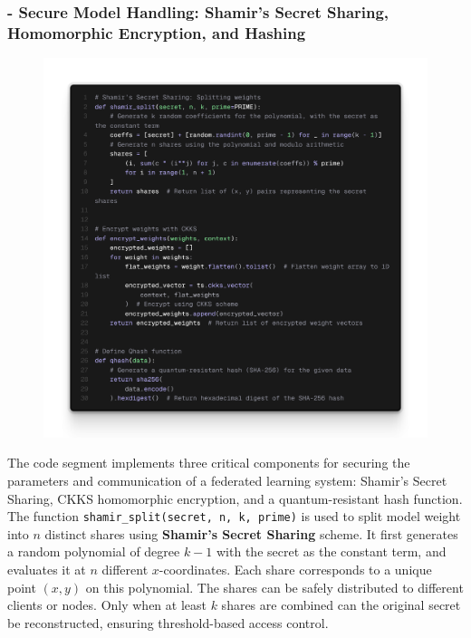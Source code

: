 \documentclass[10pt]{article}
\begin{document}
\subsubsection*{- Secure Model Handling: Shamir's Secret Sharing, Homomorphic Encryption, and Hashing}
\begin{figure}[h!]
	\centering
	\includegraphics[height = 0.47\textheight]{img/QFL_code/1.png}
\end{figure}
\noindent The code segment implements three critical components for securing the parameters and communication of a federated learning system: Shamir’s Secret Sharing, CKKS homomorphic encryption, and a quantum-resistant hash function.\\
The function \texttt{shamir\_split(secret, n, k, prime)} is used to split model weight into $n$ distinct shares using \textbf{Shamir’s Secret Sharing} scheme. It first generates a random polynomial of degree $k-1$ with the secret as the constant term, and evaluates it at $n$ different $x$-coordinates. Each share corresponds to a unique point $(x, y)$ on this polynomial. The shares can be safely distributed to different clients or nodes. Only when at least $k$ shares are combined can the original secret be reconstructed, ensuring threshold-based access control.\\
\end{document}
